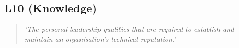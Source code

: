 \subsection*{L10 (Knowledge)}

  \begin{quote}
    \textit{'The personal leadership qualities that
    are required to establish and maintain an organisation’s
    technical reputation.'}
  \end{quote}

\newpage